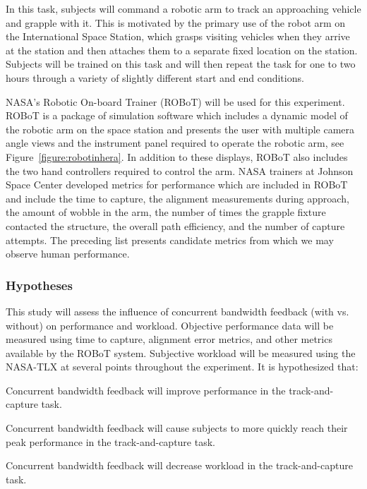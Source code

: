 In this task, subjects will command a robotic arm to track an approaching vehicle and grapple with it.
This is motivated by the primary use of the robot arm on the International Space Station, which grasps visiting vehicles when they arrive at the station and then attaches them to a separate fixed location on the station.
Subjects will be trained on this task and will then repeat the task for one to two hours through a variety of slightly different start and end conditions.

NASA's Robotic On-board Trainer (ROBoT) will be used for this experiment.
ROBoT is a package of simulation software which includes a dynamic model of the robotic arm on the space station and presents the user with multiple camera angle views and the instrument panel required to operate the robotic arm, see Figure~\ref{figure:robotinhera}.
In addition to these displays, ROBoT also includes the two hand controllers required to control the arm.
NASA trainers at Johnson Space Center developed metrics for performance which are included in ROBoT and include the time to capture, the alignment measurements during approach, the amount of wobble in the arm, the number of times the grapple fixture contacted the structure, the overall path efficiency, and the number of capture attempts.
The preceding list presents candidate metrics from which we may observe human performance.

\subsubsection{Hypotheses}
This study will assess the influence of concurrent bandwidth feedback (with vs. without) on performance and workload.
Objective performance data will be measured using time to capture, alignment error metrics, and other metrics available by the ROBoT system.
Subjective workload will be measured using the NASA-TLX at several points throughout the experiment.
It is hypothesized that:
\begin{description}[align=left]
    \item [Hypothesis 1] Concurrent bandwidth feedback will improve performance in the track-and-capture task.
    \item [Hypothesis 2] Concurrent bandwidth feedback will cause subjects to more quickly reach their peak performance in the track-and-capture task.
    \item [Hypothesis 3] Concurrent bandwidth feedback will decrease workload in the track-and-capture task.
\end{description}

